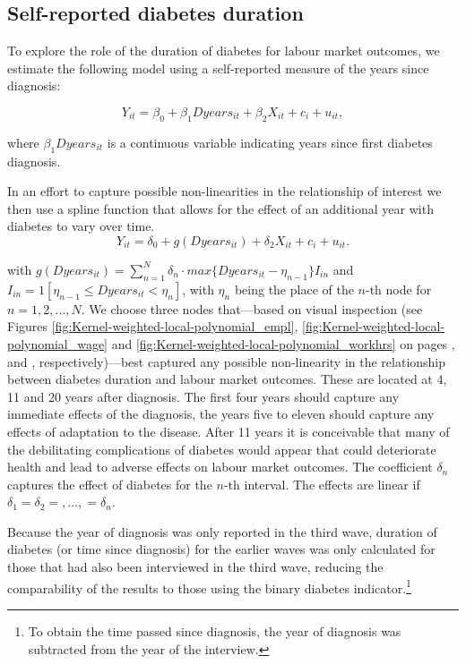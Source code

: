 \subsection{Self-reported diabetes duration}
To explore the role of the duration of diabetes for labour market outcomes, we estimate the following model using a self-reported
measure of the years since diagnosis:


\begin{equation}
Y_{it}=\beta_{0}+\beta_{1}Dyears_{it}+\beta_{2}X_{it}+c_{i}+u_{it},\label{eq:duration_linear}
\end{equation}


\noindent where $\beta_{1}Dyears_{it}$ is a continuous variable indicating years since first diabetes diagnosis.

In an effort to capture possible non-linearities in the relationship of interest we then use a spline function that allows for the effect of an additional year with diabetes to vary over time.
\begin{equation}
Y_{it}=\delta_{0}+g(Dyears_{it})+\delta_{2}X_{it}+c_{i}+u_{it}.\label{eq:splines}
\end{equation}


\noindent with $g(Dyears_{it})=\sum_{n=1}^{N}\delta_{n}\cdot max\{Dyears_{it}-\eta_{n-1}\}I_{in}$ and $I_{in}=1[\eta_{n-1}\leq Dyears_{it}<\eta_{n}]$, with $\eta_{n}$ being the place of the $n$-th node for $n=1,2,\ldots,N$. We choose three nodes that---based on visual inspection (see Figures \ref{fig:Kernel-weighted-local-polynomial_empl}, \ref{fig:Kernel-weighted-local-polynomial_wage} and \ref{fig:Kernel-weighted-local-polynomial_workhrs} on pages \pageref{fig:Kernel-weighted-local-polynomial_empl}, \pageref{fig:Kernel-weighted-local-polynomial_wage} and \pageref{fig:Kernel-weighted-local-polynomial_workhrs}, respectively)---best captured any possible non-linearity in the
relationship between diabetes duration and labour market outcomes. These are located at 4, 11 and 20 years after diagnosis. The
first four years should capture any immediate effects of the diagnosis, the years five to eleven should capture any effects of adaptation to the disease. After 11 years it is conceivable that many of the debilitating complications of diabetes would appear that could deteriorate health and lead to adverse effects on labour market outcomes. The coefficient $\delta_{n}$ captures the effect of diabetes for the $n$-th interval. The effects are linear if $\delta_{1}=\delta_{2}=,\ldots,=\delta_{n}$.

Because the year of diagnosis was only reported in the third wave, duration of diabetes (or time since diagnosis) for the earlier waves was only calculated for those that had also been interviewed in the third wave, reducing the comparability of the results to those using the binary diabetes indicator.\footnote{To obtain the time passed since diagnosis, the year of diagnosis was subtracted from the year of the interview.}


